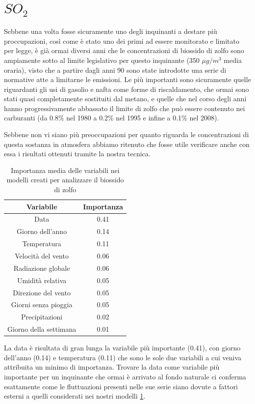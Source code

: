 \documentclass[a4paper]{report}
\begin{document}
\section{$SO_2$}
Sebbene una volta fosse sicuramente uno degli inquinanti a destare più proccupazioni, così come è stato uno dei primi ad essere monitorato e limitato per legge, è già ormai diversi anni che le concentrazioni di biossido di zolfo sono ampiamente sotto al limite legislativo per questo inquinante (350 $\mu g/m^3$ media oraria), visto che a partire dagli anni 90 sono state introdotte una serie di normative atte a limitarne le emissioni. Le più importanti sono sicuramente quelle riguardanti gli usi di gasolio e nafta come forme di riscaldamento, che ormai sono stati quasi
completamente sostituiti dal metano, e quelle che nel corso degli anni hanno progressivamente abbassato il limite di zolfo che può essere contenuto nei carburanti (da 0.8\% nel 1980 a 0.2\% nel 1995 e infine a 0.1\% nel 2008).

Sebbene non vi siano più preoccupazioni per quanto riguarda le concentrazioni di questa sostanza in atmosfera abbiamo ritenuto che fosse utile verificare anche con essa i risultati ottenuti tramite la nostra tecnica. 

\begin{table}[h!]
\centering
\begin{tabular}{ |c c| }
	\hline
	Variabile & Importanza \\
	\hline
	Data & 0.41 \\
	Giorno dell'anno & 0.14 \\
	Temperatura & 0.11 \\
	Velocità del vento & 0.06 \\
	Radiazione globale & 0.06 \\
	Umidità relativa & 0.05 \\
	Direzione del vento & 0.05 \\
	Giorni senza pioggia & 0.05 \\
	Precipitazioni & 0.02 \\
	Giorno della settimana & 0.01 \\
	\hline
\end{tabular}
\caption{Importanza media delle variabili nei modelli creati per analizzare il biossido di zolfo}
\label{table:importanza_so2}
\end{table}

La data è risultata di gran lunga la variabile più importante (0.41), con giorno dell'anno (0.14) e temperatura (0.11) che sono le sole due variabili a cui veniva attribuita un minimo di importanza. Trovare la data come variabile più importante per un inquinante che ormai è arrivato al fondo naturale ci conferma esattamente come le fluttuazioni presenti nelle sue serie siano dovute a fattori esterni a quelli considerati nei nostri modelli \ref{table:importanza_so2}.
\end{document}
